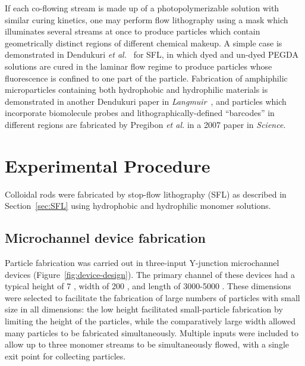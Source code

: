 If each co-flowing stream is made up of a photopolymerizable solution with similar curing kinetics, one may perform
flow lithography using a mask which illuminates several streams at once to produce particles which contain geometrically
distinct regions of different chemical makeup.  A simple case 
is demonstrated in Dendukuri \textit{et al.}~\cite{dendukuri-sfl}
for SFL, in which dyed and un-dyed PEGDA solutions are cured in the laminar flow regime to produce particles whose
fluorescence is confined to one part of the particle.  Fabrication of amphiphilic microparticles containing both
hydrophobic and hydrophilic materials is demonstrated in another Dendukuri paper in 
\textit{Langmuir}~\cite{dendukuri-amph}, and particles which incorporate biomolecule probes and lithographically-defined
``barcodes'' in different regions are fabricated by Pregibon \textit{et al.} in a 2007 paper in 
\textit{Science}.~\cite{pregibon-dna}

\section{Experimental Procedure}
\label{sec:rods-exp}

Colloidal rods were fabricated by stop-flow lithography (SFL) as described in Section~\ref{sec:SFL} using
hydrophobic and hydrophilic monomer solutions.  

\subsection{Microchannel device fabrication}


Particle fabrication was carried out in 
three-input Y-junction microchannel devices (Figure~\ref{fig:device-design}).
The primary channel of these devices had a typical 
height of 7 \microns, width of 200 \microns, and length of 3000-5000 \microns. These dimensions were selected
to facilitate the fabrication of large numbers of particles with small size in all dimensions: the low height
facilitated small-particle fabrication by limiting the height of the particles, while the comparatively large
width allowed many particles to be fabricated simultaneously. Multiple inputs were included to allow up to three
monomer streams to be simultaneously flowed, with a single exit point for collecting particles.

